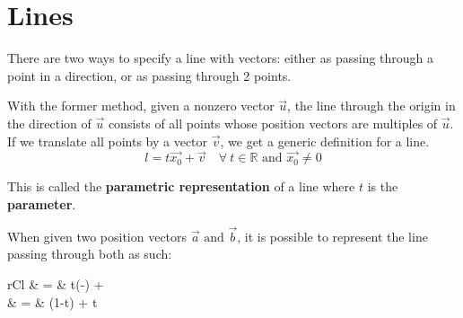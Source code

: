 \documentclass[11pt]{article}
\begin{document}
\section{Lines}
	There are two ways to specify a line with vectors: either as passing through a point in a direction, or as passing through 2 points.
	
	With the former method, given a nonzero vector $\vec{u}$, the line through the origin in the direction of $\vec{u}$ consists of all points whose position vectors are multiples of $\vec{u}$. If we translate all points by a vector $\vec{v}$, we get a generic definition for a line.
	\begin{equation}
		l = t\vec{x_0} + \vec{v} \quad \forall \ t \in \mathbb{R} \text{ and } \vec{x_0}\neq 0
	\end{equation}
	
	This is called the \textbf{parametric representation} of a line where $t$ is the \textbf{parameter}.
	
	\begin{center}
	\end{center}
	
	When given two position vectors $\vec{a} \text{ and } \vec{b}$, it is possible to represent the line passing through both as such:
	
	\begin{IEEEeqnarray}{rCl}
		 & = & t(-\vec{a}) + \\
		 & = & (1-t) + t
	\end{IEEEeqnarray}
	
\end{document}
